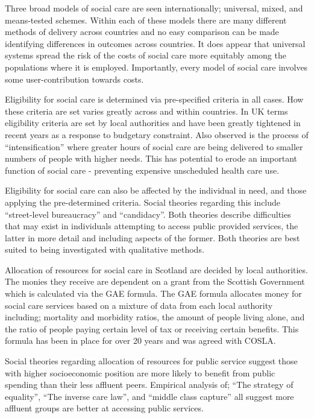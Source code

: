 \documentclass[12pt,]{report}
\begin{document}
Three broad models of social care are seen internationally; universal,
mixed, and means-tested schemes. Within each of these models there are
many different methods of delivery across countries and no easy
comparison can be made identifying differences in outcomes across
countries. It does appear that universal systems spread the risk of the
costs of social care more equitably among the populations where it is
employed. Importantly, every model of social care involves some
user-contribution towards costs.

Eligibility for social care is determined via pre-specified criteria in
all cases. How these criteria are set varies greatly across and within
countries. In UK terms eligibility criteria are set by local authorities
and have been greatly tightened in recent years as a response to
budgetary constraint. Also observed is the process of
``intensification'' where greater hours of social care are being
delivered to smaller numbers of people with higher needs. This has
potential to erode an important function of social care - preventing
expensive unscheduled health care use.

Eligibility for social care can also be affected by the individual in
need, and those applying the pre-determined criteria. Social theories
regarding this include ``street-level bureaucracy'' and ``candidacy''.
Both theories describe difficulties that may exist in individuals
attempting to access public provided services, the latter in more detail
and including aspects of the former. Both theories are best suited to
being investigated with qualitative methods.

Allocation of resources for social care in Scotland are decided by local
authorities. The monies they receive are dependent on a grant from the
Scottish Government which is calculated via the GAE formula. The GAE
formula allocates money for social care services based on a mixture of
data from each local authority including; mortality and morbidity
ratios, the amount of people living alone, and the ratio of people
paying certain level of tax or receiving certain benefits. This formula
has been in place for over 20 years and was agreed with COSLA.

Social theories regarding allocation of resources for public service
suggest those with higher socioeconomic position are more likely to
benefit from public spending than their less affluent peers. Empirical
analysis of; ``The strategy of equality'', ``The inverse care law'', and
``middle class capture'' all suggest more affluent groups are better at
accessing public services.
\end{document}
